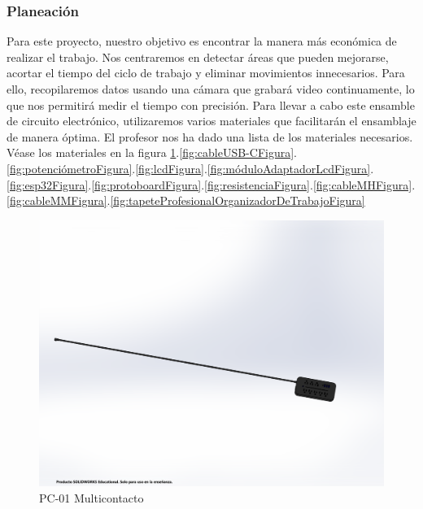     \subsubsection{Planeación}
    Para este proyecto, nuestro objetivo es encontrar la manera más económica de realizar el trabajo. Nos centraremos en detectar áreas que pueden mejorarse, acortar el tiempo del ciclo de trabajo y eliminar movimientos innecesarios. Para ello, recopilaremos datos usando una cámara que grabará video continuamente, lo que nos permitirá medir el tiempo con precisión. Para llevar a cabo este ensamble de circuito electrónico, utilizaremos varios materiales que facilitarán el ensamblaje de manera óptima. El profesor nos ha dado una lista de los materiales necesarios. Véase los materiales en la figura \ref{fig:multicontactoFigura}.\ref{fig:cableUSB-CFigura}.\ref{fig:potenciómetroFigura}.\ref{fig:lcdFigura}.\ref{fig:móduloAdaptadorLcdFigura}.\ref{fig:esp32Figura}.\ref{fig:protoboardFigura}.\ref{fig:resistenciaFigura}.\ref{fig:cableMHFigura}.\ref{fig:cableMMFigura}.\ref{fig:tapeteProfesionalOrganizadorDeTrabajoFigura}
    \begin{figure}[H]
        \centering
        \includegraphics[trim = {5mm 50mm 15mm 60mm},clip,scale=0.2]{3/Img/multicontactoFigura.pdf}
        \caption{PC-01 Multicontacto}
        \label{fig:multicontactoFigura}
    \end{figure}
